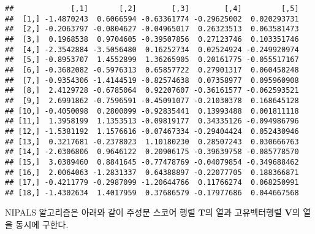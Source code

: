 \documentclass[
]{book}
\begin{document}
\begin{verbatim}
##             [,1]       [,2]        [,3]        [,4]         [,5]
##  [1,] -1.4870243  0.6066594 -0.63361774 -0.29625002  0.020293731
##  [2,] -0.2063797 -0.0804627 -0.04965017  0.26323513  0.063581473
##  [3,]  0.1968538  0.9704605 -0.39507856  0.27123746  0.103351746
##  [4,] -2.3542884 -3.5056480  0.16252734  0.02524924 -0.249920974
##  [5,] -0.8953707  1.4552899  1.36265905  0.20161775 -0.055517167
##  [6,] -0.3682082 -0.5976313  0.65857722  0.27901317  0.060458248
##  [7,] -0.9354306 -1.4144519 -0.82574638  0.07358977  0.095960908
##  [8,]  2.4129728 -0.6785064  0.92207607 -0.36161577 -0.062593521
##  [9,]  2.6991862 -0.7596591 -0.45091077 -0.21030378  0.168645128
## [10,] -0.4050098  0.2800099 -0.92835441  0.13993488  0.001811118
## [11,]  1.3958199  1.1353513 -0.09819177  0.34335126 -0.094986796
## [12,] -1.5381192  1.1576616 -0.07467334 -0.29404424  0.052430946
## [13,]  0.3217681 -0.2378023  1.10180230  0.28507243  0.030666763
## [14,] -2.0306806  0.9646122  0.20906175 -0.39639758 -0.085778570
## [15,]  3.0389460  0.8841645 -0.77478769 -0.04079854 -0.349688462
## [16,]  2.0064063 -1.2831337  0.64388897 -0.22077705  0.188366871
## [17,] -0.4211779 -0.2987099 -1.20644766  0.11766274  0.068250991
## [18,] -1.4302634  1.4017959  0.37686579 -0.17977686  0.044667568
\end{verbatim}

NIPALS 알고리즘은 아래와 같이 주성분 스코어 행렬 \(\mathbf{T}\)의 열과 고유벡터행렬 \(\mathbf{V}\)의 열을 동시에 구한다.
\end{document}
